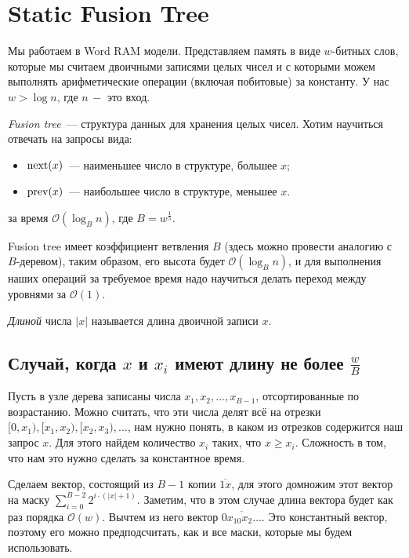 \section{Static Fusion Tree} 

Мы работаем в Word RAM модели. Представляем память в виде $w$-битных слов, которые мы считаем двоичными записями целых чисел и с которыми можем выполнять арифметические операции (включая побитовые) за константу. У нас $w > \log n$, где $n\, -$ это вход.

\emph{Fusion tree}~--- структура данных для хранения целых чисел.
Хотим научиться отвечать на запросы вида:
\begin{itemize}
    \item $\operatorname{next}(x)$~--- наименьшее число в структуре, большее $x$;
    \item $\operatorname{prev}(x)$~--- наибольшее число в структуре, меньшее $x$.
\end{itemize}
за время $\mathcal{O}(\log_B n)$, где $B = w^{\frac{1}{5}}$.

Fusion tree имеет коэффициент ветвления $B$ (здесь можно провести аналогию с $B$-деревом), таким образом, его высота будет $\mathcal{O}(\log_B n)$, и для выполнения наших операций за требуемое время надо научиться делать переход между уровнями за $\mathcal{O}(1)$.

\textit{Длиной} числа $|x|$ называется длина двоичной записи $x$.

\subsection{Случай, когда $x$ и $x_i$ имеют длину не более $\frac{w}{B}$}

Пусть в узле дерева записаны числа $x_1, x_2, \ldots, x_{B-1}$, отсортированные по возрастанию. Можно считать, что эти числа делят всё на отрезки $[0, x_1), [x_1, x_2), [x_2,x_3), \ldots$, нам нужно понять, в каком из отрезков содержится наш запрос $x$. Для этого найдем количество $x_i$ таких, что $x \geqslant x_i$. Сложность в том, что нам это нужно сделать за константное время.

Сделаем вектор, состоящий из $B-1$ копии $\overline{1x}$, для этого домножим этот вектор на маску $\sum_{i=0}^{B-2} 2^{i\cdot(|x|+1)}$. Заметим, что в этом случае длина вектора будет как раз порядка $\mathcal{O}(w)$.
Вычтем из него вектор $\overline{0x_10x_2\ldots}$. Это константный вектор, поэтому его можно предподсчитать, как и все маски, которые мы будем использовать.

